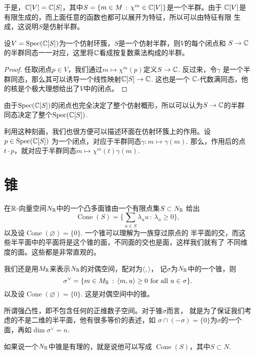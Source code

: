 于是，$\mathbb{C}[V]=\mathbb{C}[S]$，其中$S=\{m\in M\,:\, \chi^m\in \mathbb{C}[V]\}$是一个半群。由于
$\mathbb{C}[V]$是有限生成的，而上面任意的函数也都可以展开为特征，所以可以由特征有限
生成，这说明$S$是仿射半群。

\begin{pro}
    设$V=\operatorname{Spec}(\mathbb{C}[S])$为一个仿射环簇，$S$是一个仿射半群，则$V$的每个闭点和
    $S\to \mathbb{C}$的半群同态一一对应，这里将$\mathbb{C}$看成按复数乘法构成的半群。
\end{pro}

\begin{proof}
    任取闭点$p\in V$，我们通过$m\mapsto \chi^m(p)$定义$S\to \mathbb{C}$. 反过来，令$\gamma$
    是一个半群同态，那么其可以诱导一个线性映射$\mathbb{C}[S]\to \mathbb{C}$. 这也是一个
    $\mathbb{C}$-代数满同态，他的核是个极大理想给出了$V$中的闭点。
\end{proof}

由于$\operatorname{Spec}(\mathbb{C}[S])$的闭点也完全决定了整个仿射概形，所以可以认为$S\to \mathbb{C}$的半群
同态决定了整个$\operatorname{Spec}(\mathbb{C}[S])$. 

利用这种刻画，我们也很方便可以描述环面在仿射环簇上的作用。设$p\in \operatorname{Spec}(\mathbb{C}[S])$
为一个闭点，对应于半群同态$\gamma:m\mapsto \gamma(m)$. 那么，作用后的点
$t\cdot p$，就对应于半群同态$m\mapsto \chi^m(t)\gamma(m)$.

\section{锥}

\para[锥] 在$\mathbb{R}$-向量空间$N_{\mathbb{R}}$中的一个凸多面锥由一个有限点集$S\subset N_{\mathbb{R}}$
给出
\[
    \operatorname{Cone}(S)=\biggl\{\sum_{u\in S}\lambda_u u\,:\,
    \lambda_u\geq 0\biggr\},
\]
以及设$\operatorname{Cone}(\varnothing)=\{0\}$. 一个锥可以理解为一族穿过原点的
半平面的交，而这些半平面中的平面将是这个锥的面，不同面的交也是面，这样我们就有了
不同维度的面。这些都是非常直观的。

\para[对偶锥] 我们还是用$M_{\mathbb{R}}$来表示$N_{\mathbb{R}}$的对偶空间，配对为$\langle,\rangle$，
记$\sigma$为$N_{\mathbb{R}}$中的一个锥，则
\[
    \sigma^{\vee}=\{m\in M_{\mathbb{R}}\,:\,\langle m,u\rangle\geq 0\text{ for all $u\in \sigma$}\}.
\]
以及设$\operatorname{Cone}(\varnothing)=\{0\}$. 这是对偶空间中的锥。

\para[强凸性] 所谓强凸性，即不包含任何的正维数子空间。对于锥$\sigma$而言，
就是为了保证我们考虑的不是二维的半平面，他有很多等价的表述，如
$\sigma\cap(-\sigma)=\{0\}$为$\sigma$的一个面，再如$\dim \sigma^\vee=n$.

\para[有理锥] 如果说一个$N_{\mathbb{R}}$中锥是有理的，就是说他可以写成
$\operatorname{Cone}(S)$，其中$S\subset N$.

